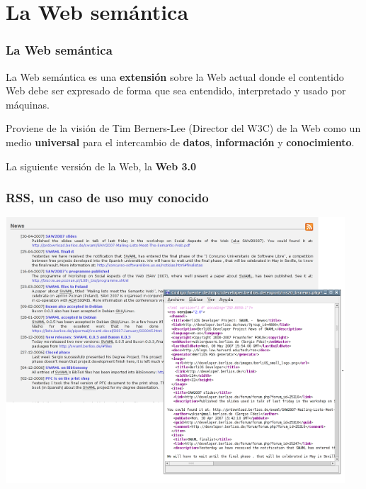 \documentclass[spanish,notes=hide]{beamer}
\begin{document}
\section{La Web semántica}
\frame
{
  \frametitle{La Web semántica}

  \begin{Large}
    La Web semántica es una \textbf{extensión} sobre la Web actual donde el 
    contentido Web debe ser expresado de forma que sea entendido, interpretado 
    y usado por máquinas.
  \end{Large}
  
  \vspace{1cm}

  \begin{Large}
    Proviene de la visión de Tim Berners-Lee (Director del W3C) de la Web como un
    medio \textbf{universal} para el intercambio de \textbf{datos}, \textbf{información} 
    y \textbf{conocimiento}.
  \end{Large}

  \vspace{1cm}

  \begin{Large}
    La siguiente versión de la Web, la \textbf{Web 3.0}
  \end{Large}
}
\frame
{
  \frametitle{RSS, un caso de uso muy conocido}

  \begin{center}
    \includegraphics[width=0.95\textwidth]{images/rss.png}
  \end{center}
}
\frame
\end{document}
